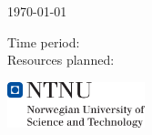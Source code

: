 \begin{titlepage}
	\vfill\vfill
		{\large\today} %
    \vfill\vfill
	
    
    \footnotesize{Time period: \timePeriod}
    \\[0.3cm]
    \footnotesize{Resources planned: \resourcesPlanned}
    \vfill
    \homepage
    
    \vfill
    
    
	
	\vfill\vfill
	\includegraphics[width=0.3\textwidth]{./hovedlogo_eng.png}
	\vfill
	 
	\vfill
	
\end{titlepage}
